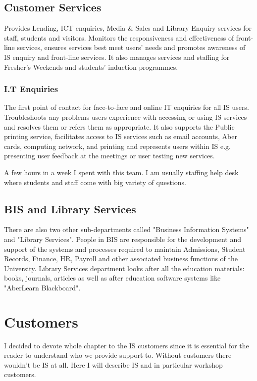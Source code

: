 \documentclass[10pt,a4paper,headinclude=true]{report}
\begin{document}
\section{Customer Services}
Provides Lending, ICT enquiries, Media \& Sales and Library Enquiry services for staff, students and visitors. Monitors the responsiveness and effectiveness of front-line services, ensures services best meet users' needs and promotes awareness of IS enquiry and front-line services. It also manages services and staffing for Fresher's Weekends and students' induction programmes.\cite{InternalTeamdescription}
\subsection{I.T Enquiries}
The first point of contact for face-to-face and online IT enquiries for all IS users. Troubleshoots any problems users experience with accessing or using IS services and resolves them or refers them as appropriate. It also supports the Public printing service, facilitates access to IS services such as email accounts, Aber cards, computing network, and printing and represents users within IS e.g. presenting user feedback at the meetings or user testing new services. \cite{InternalTeamdescription}

A few hours in a week I spent with this team. I am usually staffing help desk where students and staff come with big variety of questions.

\section{BIS and Library Services}
There are also two other sub-departments called "Business Information Systems" and "Library Services". People in BIS are  responsible for the development and support of the systems and processes required to maintain Admissions, Student Records, Finance, HR, Payroll and other associated business functions of the University. Library Services department looks after all the education materials: books, journals, articles as well as after education software systems like "AberLearn Blackboard".\cite{InternalTeamdescription}

\chapter{Customers}
I decided to devote whole chapter to the IS customers since it is essential for the reader to understand who we provide support to. Without customers there wouldn't be IS at all. Here I will describe IS and in particular workshop customers.
\end{document}
